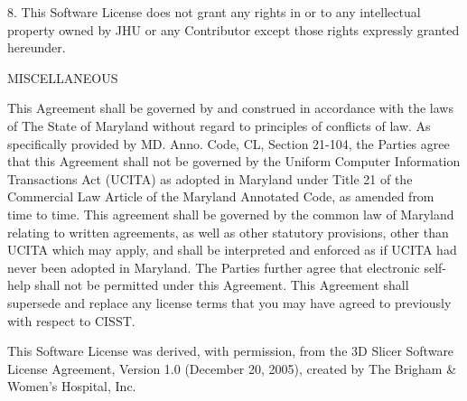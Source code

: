 \begin{DoxyPre}8. This Software License does not grant any rights in or to any
   intellectual property owned by JHU or any Contributor except those
   rights expressly granted hereunder.\end{DoxyPre}



\begin{DoxyPre}MISCELLANEOUS\end{DoxyPre}



\begin{DoxyPre}This Agreement shall be governed by and construed in accordance with
the laws of The State of Maryland without regard to principles of
conflicts of law. As specifically provided by MD. Anno. Code, CL,
Section 21-104, the Parties agree that this Agreement shall not be
governed by the Uniform Computer Information Transactions Act (UCITA)
as adopted in Maryland under Title 21 of the Commercial Law Article of
the Maryland Annotated Code, as amended from time to time.  This
agreement shall be governed by the common law of Maryland relating to
written agreements, as well as other statutory provisions, other than
UCITA which may apply, and shall be interpreted and enforced as if
UCITA had never been adopted in Maryland.  The Parties further agree
that electronic self-help shall not be permitted under this Agreement.
This Agreement shall supersede and replace any license terms that you
may have agreed to previously with respect to CISST.\end{DoxyPre}



\begin{DoxyPre}This Software License was derived, with permission, from the 3D Slicer
Software License Agreement, Version 1.0 (December 20, 2005), created
by The Brigham \& Women's Hospital, Inc.\end{DoxyPre}



\begin{DoxyPre}  \end{DoxyPre}
 